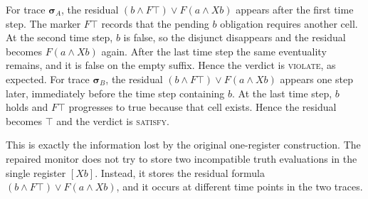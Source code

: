 For trace $\boldsymbol{\sigma}_A$, the residual $(b\land F\top)\lor F(a \land Xb)$ appears after the first time step. The marker $F\top$ records that the pending $b$ obligation requires another cell. At the second time step, $b$ is false, so the disjunct disappears and the residual becomes $F(a \land Xb)$ again. After the last time step the same eventuality remains, and it is false on the empty suffix. Hence the verdict is \textsc{violate}, as expected.
%
For trace $\boldsymbol{\sigma}_B$, the residual $(b\land F\top)\lor F(a \land Xb)$ appears one step later, immediately before the time step containing $b$. At the last time step, $b$ holds and $F\top$ progresses to true because that cell exists. Hence the residual becomes $\top$ and the verdict is \textsc{satisfy}.

This is exactly the information lost by the original one-register construction. The repaired monitor does not try to store two incompatible truth evaluations in the single register $[Xb]$. Instead, it stores the residual formula $(b\land F\top)\lor F(a\land Xb)$, and it occurs at different time points in the two traces.

